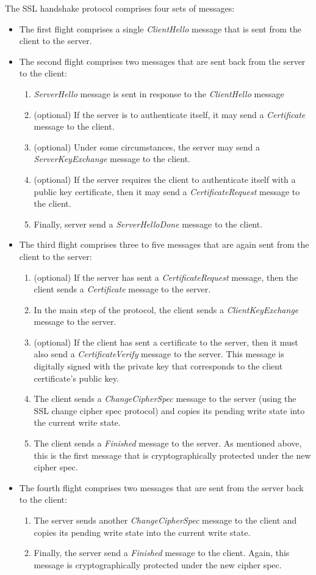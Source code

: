 \documentclass[a4paper,12pt]{article}
\begin{document}
\vspace{5mm} %
The SSL handshake protocol comprises four sets of messages:
\begin{itemize}
\item The first flight comprises a single \emph{ClientHello} message that is sent from the client to the server.
\item The second flight comprises two messages that are sent back from the server to the client:
\begin{enumerate}
\item \emph{ServerHello} message is sent in response to the \emph{ClientHello} message
\item (optional) If the server is to authenticate itself, it may send a \emph{Certificate} message to the client.
\item (optional) Under some circumstances, the server may send a \emph{ServerKeyExchange} message to the client.
\item (optional) If the server requires the client to authenticate itself with a public key certificate, then it may send a \emph{CertificateRequest} message to the client.
\item Finally, server send a \emph{ServerHelloDone} message to the client.
\end{enumerate}
\item The third flight comprises three to five messages that are again sent from the client to the server:
\begin{enumerate}
\item (optional) If the server has sent a \emph{CertificateRequest} message, then the client sends a \emph{Certificate} message to the server.
\item In the main step of the protocol, the client sends a \emph{ClientKeyExchange} message to the server.
\item (optional) If the client has sent a certificate to the server, then it must also send a \emph{CertificateVerify} message to the server. This message is digitally signed with the private key that corresponds to the client certificate's public key.
\item The client sends a \emph{ChangeCipherSpec} message to the server (using the SSL change cipher spec protocol) and copies its pending write state into the current write state.
\item The client sends a \emph{Finished} message to the server. As mentioned above, this is the first message that is cryptographically protected under the new cipher spec.
\end{enumerate}
\item The fourth flight comprises two messages that are sent from the server back to the client:
\begin{enumerate}
\item The server sends another \emph{ChangeCipherSpec} message to the client and copies its pending write state into the current write state.
\item Finally, the server send a \emph{Finished} message to the client. Again, this message is cryptographically protected under the new cipher spec.


\end{enumerate}
\end{itemize}
\end{document}
